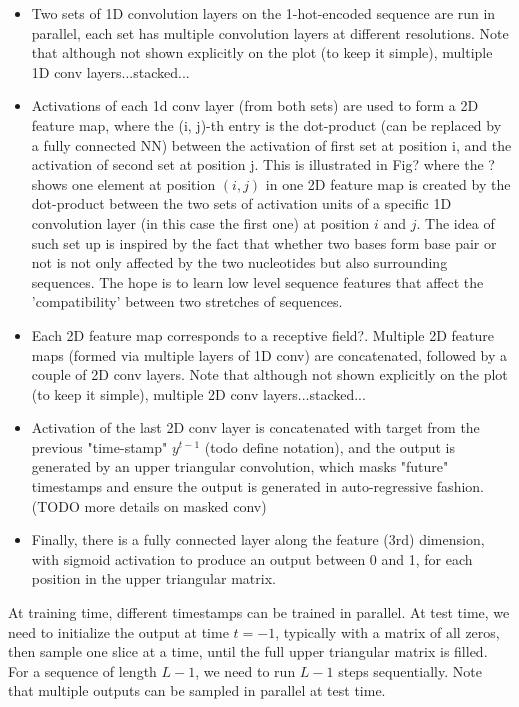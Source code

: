 \documentclass{article}
\begin{document}
\begin{itemize}

    \item Two sets of 1D convolution layers on the 1-hot-encoded sequence are run in parallel,
     each set has multiple convolution layers at different resolutions.
    Note that although not shown explicitly on the plot (to keep it simple), multiple 1D conv layers...stacked...

    \item Activations of each 1d conv layer (from both sets) are used to form a 2D feature map,
where the (i, j)-th entry is the dot-product (can be replaced by a fully connected NN) between the
activation of first set at position i, and the activation of second set at position j.
This is illustrated in Fig? where the ? shows one element at position $(i, j)$ in one
2D feature map is created by the dot-product between the
two sets of activation units of a specific 1D convolution layer (in this case the first one)
at position $i$ and $j$.
The idea of such set up is inspired by the fact that whether two bases form base pair or not
is not only affected by the two nucleotides but also surrounding sequences.
The hope is to learn low level sequence features that affect the 'compatibility'
between two stretches of sequences.

    \item Each 2D feature map corresponds to a receptive field?.
    Multiple 2D feature maps (formed via multiple layers of 1D conv) are concatenated,
followed by a couple of 2D conv layers.
Note that although not shown explicitly on the plot (to keep it simple), multiple 2D conv layers...stacked...



    \item  Activation of the last 2D conv layer is concatenated with target from the previous "time-stamp" $y^{t-1}$ (todo define notation),
and the output is generated by an upper triangular convolution,
which masks "future" timestamps and ensure the output is generated in auto-regressive fashion. (TODO more details on masked conv)

    \item Finally, there is a fully connected layer along the feature (3rd) dimension,
   with sigmoid activation to produce an output between 0 and 1,
    for each position in the upper triangular matrix.

\end{itemize}

At training time, different timestamps can be trained in parallel.
At test time, we need to initialize the output at time $t=-1$, typically with a matrix of all zeros,
then sample one slice at a time, until the full upper triangular matrix is filled.
For a sequence of length $L-1$, we need to run $L-1$ steps sequentially.
Note that multiple outputs can be sampled in parallel at test time.
\end{document}
